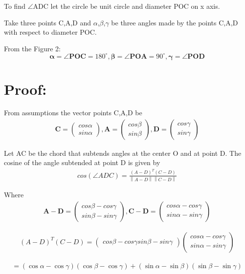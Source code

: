 \documentclass[journal,10pt,twocolumn]{article}
\providecommand{\norm}[1]{\left\lVert#1\right\rVert}
\let\vec\mathbf
\newcommand{\myvec}[1]{\ensuremath{\begin{pmatrix}#1\end{pmatrix}}}
\begin{document}
To find $\angle$ADC let the circle be unit circle and diameter POC on x axis.
\vspace*{3mm}

Take three points C,A,D  and $\alpha$,$\beta$,$\gamma$ be three angles made by the points C,A,D with respect to diameter POC.
\vspace*{3mm}

From the Figure 2:
\begin{equation}
\vec{\alpha} = \vec{\angle POC}= 180^\circ, 
\vec{\beta} = \vec{\angle POA} = 90^\circ,
\vec{\gamma} = \vec{\angle POD}
\end{equation}
 
\section*{Proof:}
From assumptions the vector points C,A,D be
\begin{eqnarray}
	\vec{C} = \myvec{cos\alpha\\sin\alpha},
	\vec{A} = \myvec{cos\beta\\sin\beta},
	\vec{D} = \myvec{cos\gamma\\sin\gamma}
\end{eqnarray}

Let AC be the chord that subtends angles at the center O and at point D. The cosine of the angle subtended at point D is given by
\begin{align}
	cos(\angle ADC) = \frac{(A-D)^T(C-D)}{\norm{A-D}\norm{C-D}}
	\label{pf2-eq-1}
\end{align}

Where
 \begin{eqnarray}
	\vec{A-D} = \myvec{cos\beta - cos\gamma\\sin\beta - sin\gamma},
	\vec{C-D} = \myvec{cos\alpha - cos\gamma\\sin\alpha - sin\gamma}
\end{eqnarray}
 

\begin{eqnarray*}
	(A-D)^T(C-D)=\myvec{cos\beta - cos\gamma  sin\beta - sin\gamma}
	\myvec{cos\alpha - cos\gamma\\sin\alpha - sin\gamma}
\end{eqnarray*}

\begin{multline*}
	= (\cos\alpha-\cos\gamma)(\cos\beta-\cos\gamma)+(\sin\alpha-\sin\beta)(\sin\beta-\sin\gamma)
\end{multline*}
\end{document}
